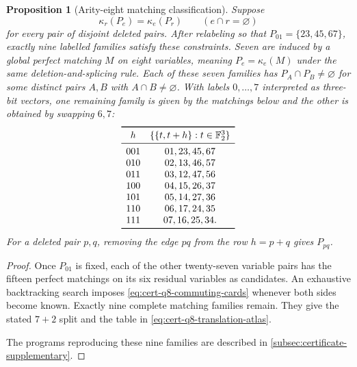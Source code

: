 \documentclass[11pt,letterpaper,onecolumn]{article}
\theoremstyle{plain}
\newtheorem{proposition}[proposition]{Proposition}
\theoremstyle{definition}
\theoremstyle{remark}
\begin{document}
	\begin{proposition}[Arity-eight matching classification]
		\label{prop:cert-q8-collision-free-atlas}
		Suppose
		\begin{equation}
			\kappa_r(P_e)=\kappa_e(P_r)
			\qquad(e\cap r=\varnothing)
			\label{eq:cert-q8-commuting-cards}
		\end{equation}
		for every pair of disjoint deleted pairs.  After relabeling so that
		\(P_{01}=\{23,45,67\}\), exactly nine labelled families satisfy these
		constraints.  Seven are induced by a global perfect matching \(M\) on eight
		variables, meaning \(P_e=\kappa_e(M)\) under the same deletion-and-splicing
		rule.  Each of these seven families has \(P_A\cap P_B\ne\varnothing\)
		for some distinct pairs \(A,B\) with \(A\cap B\ne\varnothing\).
		With labels \(0,\ldots,7\) interpreted as three-bit vectors, one remaining
		family is given by the matchings below and the other is obtained by swapping
		\(6,7\):
		\begin{equation}
			\begin{array}{cc}
				\toprule
				h&\{\{t,t+h\}:t\in\mathbb F_2^3\}\\ \midrule
				001&01,23,45,67\\
				010&02,13,46,57\\
				011&03,12,47,56\\
				100&04,15,26,37\\
				101&05,14,27,36\\
				110&06,17,24,35\\
				111&07,16,25,34.\\
				\bottomrule
			\end{array}
			\label{eq:cert-q8-translation-atlas}
		\end{equation}
		For a deleted pair \(p,q\), removing the edge \(pq\) from the row
		\(h=p+q\) gives \(P_{pq}\).
	\end{proposition}
	
	\begin{proof}
		Once \(P_{01}\) is fixed, each of the other twenty-seven variable pairs has the
		fifteen perfect matchings on its six residual variables as candidates.
		An exhaustive backtracking search imposes
        \cref{eq:cert-q8-commuting-cards} whenever both sides become known.
        Exactly nine complete matching families remain. They give the stated
        \(7+2\) split and the table in \cref{eq:cert-q8-translation-atlas}.
		
        The programs reproducing these nine families are described in
        \cref{subsec:certificate-supplementary}.
	\end{proof}
	
\end{document}
